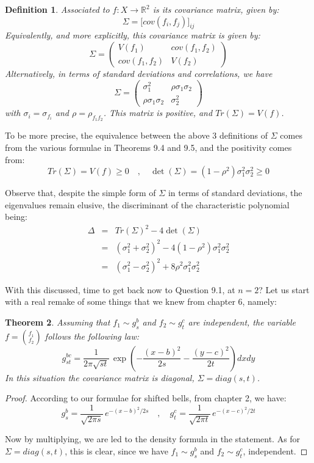 \documentclass[12pt]{amsbook}
\newtheorem{theorem}{Theorem}[chapter]
\newtheorem{definition}[theorem]{Definition}
\begin{document}
\begin{definition}
Associated to $f:X\to\mathbb R^2$ is its covariance matrix, given by:
$$\Sigma=\Big[cov(f_i,f_j)\Big]_{ij}$$
Equivalently, and more explicitly, this covariance matrix is given by:
$$\Sigma=\begin{pmatrix}V(f_1)&cov(f_1,f_2)\\ cov(f_1,f_2)&V(f_2)\end{pmatrix}$$
Alternatively, in terms of standard deviations and correlations, we have
$$\Sigma=\begin{pmatrix}\sigma_1^2&\rho\sigma_1\sigma_2\\ \rho\sigma_1\sigma_2&\sigma_2^2\end{pmatrix}$$
with $\sigma_i=\sigma_{f_i}$ and $\rho=\rho_{f_1f_2}$. This matrix is positive, and $Tr(\Sigma)=V(f)$.
\end{definition}

To be more precise, the equivalence between the above 3 definitions of $\Sigma$ comes from the various formulae in Theorems 9.4 and 9.5, and the positivity comes from:
$$Tr(\Sigma)=V(f)\geq 0\quad,\quad \det(\Sigma)=(1-\rho^2)\sigma_1^2\sigma_2^2\geq0$$

Observe that, despite the simple form of $\Sigma$ in terms of standard deviations, the eigenvalues remain elusive, the discriminant of the characteristic polynomial being:
\begin{eqnarray*}
\Delta
&=&Tr(\Sigma)^2-4\det(\Sigma)\\
&=&(\sigma_1^2+\sigma_2^2)^2-4(1-\rho^2)\sigma_1^2\sigma_2^2\\
&=&(\sigma_1^2-\sigma_2^2)^2+8\rho^2\sigma_1^2\sigma_2^2
\end{eqnarray*}

With this discussed, time to get back now to Question 9.1, at $n=2$? Let us start with a real remake of some things that we knew from chapter 6, namely:

\begin{theorem}
Assuming that $f_1\sim g_s^b$ and $f_2\sim g_t^c$ are independent, the variable $f=\binom{f_1}{f_2}$ follows the following law:
$$g_{st}^{bc}=\frac{1}{2\pi\sqrt{st}}\,\exp\left(-\frac{(x-b)^2}{2s}-\frac{(y-c)^2}{2t}\right)dxdy$$
In this situation the covariance matrix is diagonal, $\Sigma=diag(s,t)$.
\end{theorem}

\begin{proof}
According to our formulae for shifted bells, from chapter 2, we have:
$$g_s^b=\frac{1}{\sqrt{2\pi s}}\,e^{-(x-b)^2/2s}\quad,\quad 
g_t^c=\frac{1}{\sqrt{2\pi t}}\,e^{-(x-c)^2/2t}$$

Now by multiplying, we are led to the density formula in the statement. As for $\Sigma=diag(s,t)$, this is clear, since we have $f_1\sim g_s^b$ and $f_2\sim g_t^c$, independent.
\end{proof}
\end{document}
